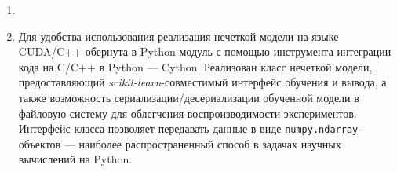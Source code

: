 \begin{enumerate}
	\item {}
	\item Для удобства использования реализация нечеткой модели на языке CUDA/C++ обернута в Python-модуль с помощью инструмента интеграции кода на C/C++ в Python --- Cython. Реализован класс нечеткой модели, предоставляющий \textit{scikit-learn}-совместимый интерфейс обучения и вывода, а также возможность сериализации/десериализации обученной модели в файловую систему для облегчения воспроизводимости экспериментов. Интерфейс класса позволяет передавать данные в виде \lstinline|numpy.ndarray|-объектов --- наиболее распространенный способ в задачах научных вычислений на Python.
\end{enumerate}

